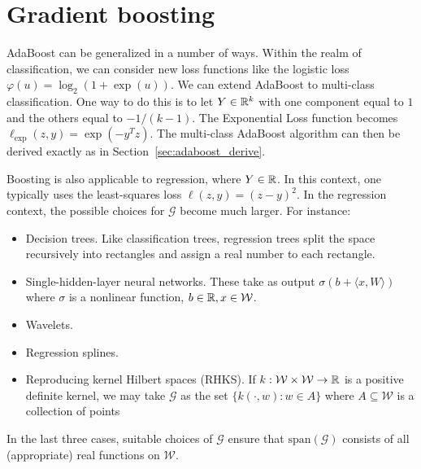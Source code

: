 \section{Gradient boosting}
AdaBoost can be generalized in a number of ways. Within the realm of classification, we can consider new loss functions like the logistic loss $\varphi(u) = \log_2 (1+ \exp(u))$. We can extend AdaBoost to multi-class classification. One way to do this is to let $Y \in \mathbb{R}^k$ with one component equal to $1$ and the others equal to $-1/(k-1)$. The Exponential Loss function becomes $\ell_\text{exp}(z, y) = \exp(-y^T z)$. The multi-class AdaBoost algorithm can then be derived exactly as in Section~\ref{sec:adaboost_derive}.

Boosting is also applicable to regression, where $Y \in \mathbb{R}$. In this context, one typically uses the least-squares loss $\ell(z, y) = (z - y)^2$. In the regression context, the possible choices for $\mathcal{G}$ become much larger. For instance:
\begin{itemize}
	\item Decision trees. Like classification trees, regression trees split the space recursively into rectangles and assign a real number to each rectangle.
	\item Single-hidden-layer neural networks. These take as output $\sigma(b + \langle x, W \rangle )$ where $\sigma$ is a nonlinear function, $b \in \mathbb{R}, x \in \mathcal{W}$.
	\item Wavelets.
	\item Regression splines.
	\item Reproducing kernel Hilbert spaces (RHKS). If $k: \mathcal{W} \times \mathcal{W} \to \mathbb{R}$ is a positive definite kernel, we may take $\mathcal{G}$ as the set $\{k(\cdot, w): w \in A\}$ where $A \subseteq \mathcal{W}$ is a collection of points
\end{itemize}
In the last three cases, suitable choices of $\mathcal{G}$ ensure that $\text{span}(\mathcal{G})$ consists of all (appropriate) real functions on $\mathcal{W}$.

